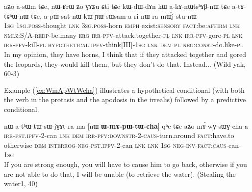 \documentclass[oldfontcommands,oneside,a4paper,11pt]{article}
\newcommand{\ipa}[1]{{\phon \mbox{#1}}} %
\newcommand{\refb}[1]{(\ref{#1})}
\begin{document}
\begin{exe}
\ex \label{ex:akAnWtshABnW}
\gll 
 \ipa{aʑo}  	\ipa{a-sɯm}  	\ipa{tɕe,}  	\ipa{nɯ-ʁrɯ}  	\ipa{ʑo}  	\ipa{ɣɤʑu}  	\ipa{ɕti}  	\ipa{tɕe}  \ipa{kɯ-dɯ-dɤn}  	\ipa{kɯ}  \ipa{a-kɤ-nɯtsʰɤβ-nɯ}  	\ipa{tɕe}  	\ipa{a-tɤ-tɕʰɯ-nɯ}  	\ipa{tɕe,}  \ipa{a-pɯ-sat-nɯ}  	\ipa{kɯ}  	\ipa{ɲɯ-sɯsam-a}  \ipa{ri} \ipa{nɯ} \ipa{ra}  	\ipa{mɯ́j-stu-nɯ}  \\
 \textsc{1sg} \textsc{1sg.poss}-thought \textsc{lnk} \textsc{3sg.poss}-horn \textsc{emph} exist:\textsc{sensory} \textsc{fact}:be:\textsc{affirm} \textsc{lnk} \textsc{nmlz}:S/A-\textsc{redp}-be.many \textsc{erg} \textsc{irr-pfv}-attack.together-\textsc{pl} \textsc{lnk}  \textsc{irr-pfv}-gore-\textsc{pl} \textsc{lnk}  \textsc{irr-pfv}-kill-\textsc{pl} \textsc{hypothetical} \textsc{ipfv}-think[III]-\textsc{1sg} \textsc{lnk} \textsc{dem} \textsc{pl} \textsc{neg:const}-do.like-\textsc{pl} \\
\glt In my opinion, they have horns, I think that if they attacked together and gored the leopards, they would kill them, but they don't do that. Instead... (Wild yak, 60-3)
\end{exe} 

Example  \refb{ex:WmApWtWcha} illustrates a hypothetical conditional  (with both the verb in the protasis and the apodosis in the irrealis) followed by a predictive conditional.

\begin{exe}
\ex \label{ex:WmApWtWcha}
\gll 
[\textbf{\ipa{a-pɯ-tɯ-cha}}]  	\ipa{nɤ,}  	\ipa{nɯ}  	\ipa{a-tʰɯ-tɯ-sɯ-jɣɤt}  	\ipa{ra}  	\ipa{ma}  	[\ipa{nɯ}  	\textbf{\ipa{ɯ-mɤ-pɯ-tɯ-cha}}]  	\ipa{qʰe}  	\ipa{tɕe}  	\ipa{aʑo}  	\ipa{mɤ́-wɣ-sɯɣ-cha-a}  	  \\
\textsc{irr-pst.ipfv-2}-can \textsc{lnk} \textsc{dem} \textsc{irr-pfv:downstr-2-caus}-turn.around \textsc{fact}:have.to otherwise
\textsc{dem}  \textsc{interrog-neg-pst.ipfv}-2-can \textsc{lnk} \textsc{lnk} \textsc{1sg} \textsc{neg-inv-fact:caus}-can-\textsc{1sg} \\
\glt If you are strong enough, you will have to cause him to go back, otherwise if you are not able to do that, I will be unable (to retrieve the water). (Stealing the water1, 40)
\end{exe} 
\end{document}
